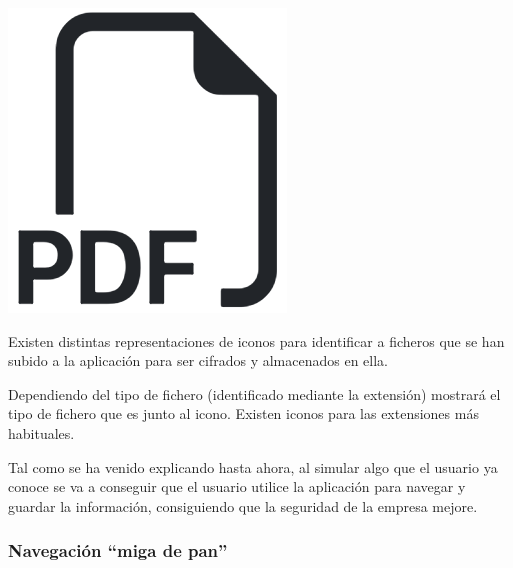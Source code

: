 \documentclass{\ClassPath/viu-tfm-template}
\begin{document}
{
    \begin{minipage}{0.1\linewidth}
        \includegraphics[width=\linewidth]{img/file.png}
    \end{minipage}
    \hspace{0.5cm}
    \begin{minipage}{0.9\linewidth}
        Existen distintas representaciones de iconos para identificar a ficheros que se han subido a la aplicación para ser cifrados y almacenados en ella.

        Dependiendo del tipo de fichero (identificado mediante la extensión) mostrará el tipo de fichero que es junto al icono. Existen iconos para las extensiones más habituales.
    \end{minipage}
}

Tal como se ha venido explicando hasta ahora, al simular algo que el usuario ya conoce se va a conseguir que el usuario utilice la aplicación para navegar y guardar la información, consiguiendo que la seguridad de la empresa mejore.


\subsubsection*{Navegación “miga de pan”}
\end{document}
